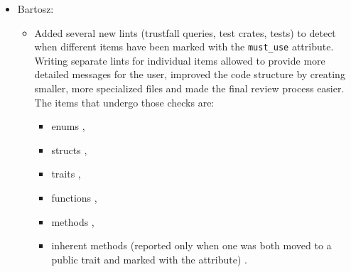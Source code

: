\documentclass[licencjacka,en]{pracamgr}
\begin{document}
\begin{itemize}
\begin{itemize}
		\end{itemize}

	\item Bartosz:
		\begin{itemize}



			\item Added several new lints (trustfall queries, test crates, tests)
				to detect when different items have been marked with the \texttt{must\_use}
				attribute. Writing separate lints for individual items allowed to provide more
				detailed messages for the user, improved the code structure by creating smaller,
				more specialized files and made the final review process easier. The items that
				undergo those checks are:
				\begin{itemize}
					\item enums \cite{pr_lint_enum_must_use_added},
					\item structs \cite{pr_lint_struct_must_use_added},
					\item traits \cite{pr_lint_trait_must_use_added},
					\item functions \cite{pr_lint_function_must_use_added},
					\item methods \cite{pr_method_moved_to_trait_must_use_added},
					\item inherent methods (reported only when one was both moved to
						a public trait and marked with the attribute)
						\cite{pr_inherent_method_must_use_added}.
				\end{itemize}


\end{itemize}
\end{itemize}
\end{document}

